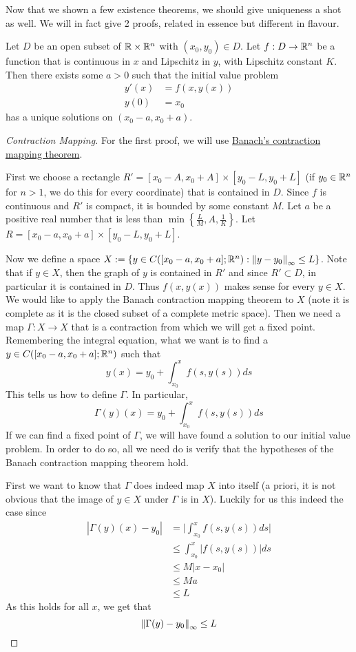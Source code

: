 Now that we shown a few existence theorems, we should give uniqueness a shot as well. We will in fact give 2 proofs, related in essence but different in flavour.
\begin{theorem}\label{thm:ext-and-unq-lip}
    Let $D$ be an open subset of $\mathbb{R} \times \mathbb{R}^n$ with $(x_0, y_0) \in D$. Let $f: D \to \mathbb{R}^n$ be a function that is continuous in $x$ and Lipschitz in $y$, with Lipschitz constant $K$. Then there exists some $a > 0$ such that the initial value problem
    \begin{align*}
        y'(x) &= f(x, y(x))\\
        y(0) &= x_0
    \end{align*}
    has a unique solutions on $(x_0 - a, x_0 + a)$.
\end{theorem}
\begin{proof}[Contraction Mapping]
    For the first proof, we will use \hyperref[thm:banach-con-map]{Banach's contraction mapping theorem}. 
    
    First we choose a rectangle $R' = [x_0 - A, x_0 + A] \times [y_0 - L, y_0 + L]$ (if $y_0 \in \mathbb{R}^n$ for $n > 1$, we do this for every coordinate) that is contained in $D$. Since $f$ is continuous and $R'$ is compact, it is bounded by some constant $M$. Let $a$ be a positive real number that is less than $\min\left\{ \frac{L}{M}, A, \frac{1}{K} \right\}$. Let $R = [x_0 - a, x_0 + a] \times [y_0 - L, y_0 + L]$. 
    
    Now we define a space $X := \{y \in C([x_0 - a, x_0 + a]; \mathbb{R}^n) : \left\lVert y - y_0\right\rVert_{\infty} \leq L\}$. Note that if $y \in X$, then the graph of $y$ is contained in $R'$ and since $R' \subset D$, in particular it is contained in $D$. Thus $f(x, y(x))$ makes sense for every $y \in X$. We would like to apply the Banach contraction mapping theorem to $X$ (note it is complete as it is the closed subset of a complete metric space). Then we need a map $\Gamma: X \to X$ that is a contraction from which we will get a fixed point. Remembering the integral equation, what we want is to find a $y \in C([x_0 - a, x_0 + a]; \mathbb{R}^n)$ such that
    $$ y(x) = y_0 + \int_{x_0}^{x} f(s, y(s))ds $$
    This tells us how to define $\Gamma$. In particular,
    $$ \Gamma(y)(x) = y_0 + \int_{x_0}^{x} f(s, y(s))ds $$
    If we can find a fixed point of $\Gamma$, we will have found a solution to our initial value problem. In order to do so, all we need do is verify that the hypotheses of the Banach contraction mapping theorem hold.
    
    First we want to know that $\Gamma$ does indeed map $X$ into itself (a priori, it is not obvious that the image of $y \in X$ under $\Gamma$ is in $X$). Luckily for us this indeed the case since
    \begin{align*}
        |\Gamma(y)(x) - y_0| &= \bigg| \int_{x_0}^{x} f(s, y(s)) ds \bigg|\\
        &\leq \int_{x_0}^{x} |f(s, y(s))| ds\\
        &\leq M |x - x_0|\\
        &\leq Ma\\
        &\leq L
    \end{align*}
    As this holds for all $x$, we get that
    $$ \left\lVert\Gamma(y) - y_0\right\rVert_{\infty} \leq L $$
    

\end{proof}
